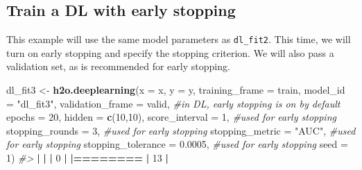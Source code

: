 \documentclass[]{book}
\newenvironment{Shaded}{\begin{snugshade}}{\end{snugshade}}
\newcommand{\CommentTok}[1]{\textcolor[rgb]{0.56,0.35,0.01}{\textit{#1}}}
\newcommand{\DataTypeTok}[1]{\textcolor[rgb]{0.13,0.29,0.53}{#1}}
\newcommand{\DecValTok}[1]{\textcolor[rgb]{0.00,0.00,0.81}{#1}}
\newcommand{\ErrorTok}[1]{\textcolor[rgb]{0.64,0.00,0.00}{\textbf{#1}}}
\newcommand{\FloatTok}[1]{\textcolor[rgb]{0.00,0.00,0.81}{#1}}
\newcommand{\KeywordTok}[1]{\textcolor[rgb]{0.13,0.29,0.53}{\textbf{#1}}}
\newcommand{\NormalTok}[1]{#1}
\newcommand{\OperatorTok}[1]{\textcolor[rgb]{0.81,0.36,0.00}{\textbf{#1}}}
\newcommand{\StringTok}[1]{\textcolor[rgb]{0.31,0.60,0.02}{#1}}
\begin{document}
\hypertarget{train-a-dl-with-early-stopping}{%
\subsection{Train a DL with early stopping}\label{train-a-dl-with-early-stopping}}

This example will use the same model parameters as \texttt{dl\_fit2}. This time, we will turn on
early stopping and specify the stopping criterion. We will also pass a validation set, as is recommended for early stopping.

\begin{Shaded}
\begin{Highlighting}[]
\NormalTok{dl_fit3 <-}\StringTok{ }\KeywordTok{h2o.deeplearning}\NormalTok{(}\DataTypeTok{x =}\NormalTok{ x,}
                            \DataTypeTok{y =}\NormalTok{ y,}
                            \DataTypeTok{training_frame =}\NormalTok{ train,}
                            \DataTypeTok{model_id =} \StringTok{"dl_fit3"}\NormalTok{,}
                            \DataTypeTok{validation_frame =}\NormalTok{ valid,  }\CommentTok{#in DL, early stopping is on by default}
                            \DataTypeTok{epochs =} \DecValTok{20}\NormalTok{,}
                            \DataTypeTok{hidden =} \KeywordTok{c}\NormalTok{(}\DecValTok{10}\NormalTok{,}\DecValTok{10}\NormalTok{),}
                            \DataTypeTok{score_interval =} \DecValTok{1}\NormalTok{,           }\CommentTok{#used for early stopping}
                            \DataTypeTok{stopping_rounds =} \DecValTok{3}\NormalTok{,          }\CommentTok{#used for early stopping}
                            \DataTypeTok{stopping_metric =} \StringTok{"AUC"}\NormalTok{,      }\CommentTok{#used for early stopping}
                            \DataTypeTok{stopping_tolerance =} \FloatTok{0.0005}\NormalTok{,  }\CommentTok{#used for early stopping}
                            \DataTypeTok{seed =} \DecValTok{1}\NormalTok{)}
\CommentTok{#> }
  \OperatorTok{|}\StringTok{                                                                       }
\StringTok{  }\ErrorTok{|}\StringTok{                                                                 }\ErrorTok{|}\StringTok{   }\DecValTok{0}\NormalTok{%}
  \OperatorTok{|}\StringTok{                                                                       }
\StringTok{  }\ErrorTok{|========}\StringTok{                                                         }\ErrorTok{|}\StringTok{  }\DecValTok{13}\NormalTok{%}
  \OperatorTok{|}\StringTok{                                                                       }
}}
\end{Highlighting}
\end{Shaded}
\end{document}
